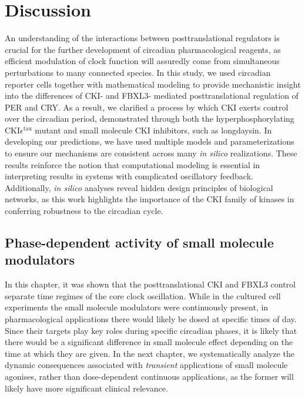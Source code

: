 \section{Discussion}
An understanding of the interactions between posttranslational regulators is crucial for the further development of circadian pharmacological reagents, as efficient modulation of clock function will assuredly come from simultaneous perturbations to many connected species. 
In this study, we used circadian reporter cells together with mathematical modeling to provide mechanistic insight into the differences of CKI- and FBXL3- mediated posttranslational regulation of PER and CRY. 
As a result, we clarified a process by which CKI exerts control over the circadian period, demonstrated through both the hyperphosphorylating CKI$\epsilon^\mathrm{tau}$ mutant and small molecule CKI inhibitors, such as longdaysin. 
In developing our predictions, we have used multiple models and parameterizations to ensure our mechanisms are consistent across many {\it in silico} realizations. 
These results reinforce the notion that computational modeling is essential in interpreting results in systems with complicated oscillatory feedback. 
Additionally, {\it in silico} analyses reveal hidden design principles of biological networks, as this work highlights the importance of the CKI family of kinases in conferring robustness to the circadian cycle. 
 
\subsection{Phase-dependent activity of small molecule modulators}
In this chapter, it was shown that the posttranslational CKI and FBXL3 control separate time regimes of the core clock oscillation. 
While in the cultured cell experiments the small molecule modulators were continuously present, in pharmacological applications there would likely be dosed at specific times of day. 
Since their targets play key roles during specific circadian phases, it is likely that there would be a significant difference in small molecule effect depending on the time at which they are given. 
In the next chapter, we systematically analyze the dynamic consequences associated with {\itshape transient} applications of small molecule agonises, rather than dose-dependent continuous applications, as the former will likely have more significant clinical relevance. 
